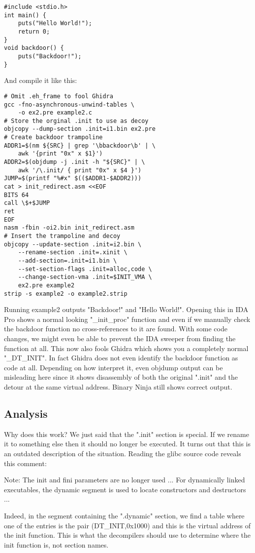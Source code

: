 \documentclass[twocolumn]{article}
\begin{document}
\begin{verbatim}
#include <stdio.h>
int main() {
    puts("Hello World!");
    return 0;
}
void backdoor() {
    puts("Backdoor!");
}
\end{verbatim}

And compile it like this:

\begin{verbatim}
# Omit .eh_frame to fool Ghidra
gcc -fno-asynchronous-unwind-tables \
    -o ex2.pre example2.c
# Store the orginal .init to use as decoy
objcopy --dump-section .init=i1.bin ex2.pre
# Create backdoor trampoline
ADDR1=$(nm ${SRC} | grep '\bbackdoor\b' | \ 
    awk '{print "0x" x $1}')
ADDR2=$(objdump -j .init -h "${SRC}" | \
    awk '/\.init/ { print "0x" x $4 }')
JUMP=$(printf "%#x" $(($ADDR1-$ADDR2)))
cat > init_redirect.asm <<EOF
BITS 64
call \$+$JUMP
ret
EOF
nasm -fbin -oi2.bin init_redirect.asm
# Insert the trampoline and decoy
objcopy --update-section .init=i2.bin \
    --rename-section .init=.xinit \
    --add-section=.init=i1.bin \
    --set-section-flags .init=alloc,code \
    --change-section-vma .init=$INIT_VMA \
    ex2.pre example2
strip -s example2 -o example2.strip
\end{verbatim}

Running example2 outputs "Backdoor!" and "Hello World!". Opening this in IDA Pro shows a normal looking "\_init\_proc" function and even if we manually check the backdoor function no cross-references to it are found. With some code changes, we might even be able to prevent the IDA sweeper from finding the function at all.
This now also fools Ghidra which shows you a completely normal "\_DT\_INIT". In fact Ghidra does not even identify the backdoor function as code at all. Depending on how interpret it, even objdump output can be misleading here since it shows disassembly of both the original ".init" and the detour at the same virtual address. Binary Ninja still shows correct output.

\vspace*{-0.5\baselineskip}
\subsection*{Analysis}

Why does this work? We just said that the ".init" section is special. If we rename it to something else then it should no longer be executed. It turns out that this is an outdated description of the situation. Reading the glibc source code reveals this comment:

\begin{displayquote}
   Note: The init and fini parameters are no longer used ...
   For dynamically linked executables, the dynamic segment is used to
   locate constructors and destructors ...
\end{displayquote}

Indeed, in the segment containing the ".dynamic" section, we find a table where one of the entries is the pair (DT\_INIT,0x1000) and this is the virtual address of the init function. This is what the decompilers should use to determine where the init function is, not section names.

\end{document}
